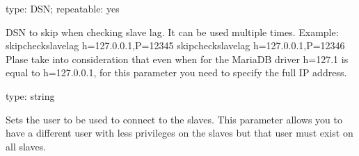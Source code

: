 \documentclass[letterpaper,10pt,english]{sphinxmanual}
\begin{document}
\begin{fulllineitems}
\label{\detokenize{mariadb-schema-change:cmdoption-mariadb-schema-change-skip-check-slave-lag}}
type: DSN; repeatable: yes

DSN to skip when checking slave lag. It can be used multiple times.
Example: \textendash{}skip\sphinxhyphen{}check\sphinxhyphen{}slave\sphinxhyphen{}lag h=127.0.0.1,P=12345 \textendash{}skip\sphinxhyphen{}check\sphinxhyphen{}slave\sphinxhyphen{}lag h=127.0.0.1,P=12346
Plase take into consideration that even when for the MariaDB driver h=127.1 is equal to h=127.0.0.1,
for this parameter you need to specify the full IP address.

\end{fulllineitems}


\begin{fulllineitems}
\label{\detokenize{mariadb-schema-change:cmdoption-mariadb-schema-change-slave-user}}
type: string

Sets the user to be used to connect to the slaves.
This parameter allows you to have a different user with less privileges on the
slaves but that user must exist on all slaves.

\end{fulllineitems}

\end{document}
